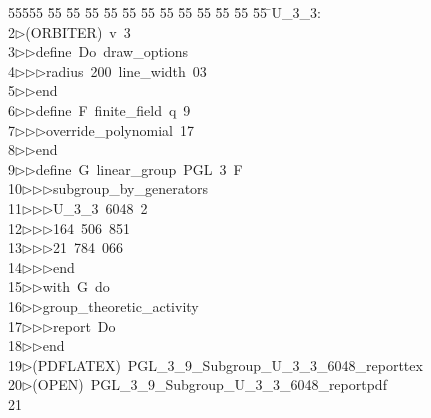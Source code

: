 %
%
\begin{tabbing}
55555 \= 55 \= 55 \= 55 \= 55 \= 55 \= 55 \= 55 \= 55 \= 55 \= 55 \= 55 \= 55 \= \>U\_3\_3:\\[0pt]
2\>$\triangleright$\>(ORBITER)\ v\ 3\ \\[0pt]
3\>$\triangleright$\>$\triangleright$\>define\ Do\ draw\_options\ \\[0pt]
4\>$\triangleright$\>$\triangleright$\>$\triangleright$\>radius\ 200\ line\_width\ 03\ \\[0pt]
5\>$\triangleright$\>$\triangleright$\>end\ \\[0pt]
6\>$\triangleright$\>$\triangleright$\>define\ F\ finite\_field\ q\ 9\ \\[0pt]
7\>$\triangleright$\>$\triangleright$\>$\triangleright$\>override\_polynomial\ 17\ \\[0pt]
8\>$\triangleright$\>$\triangleright$\>end\ \\[0pt]
9\>$\triangleright$\>$\triangleright$\>define\ G\ linear\_group\ PGL\ 3\ F\ \\[0pt]
10\>$\triangleright$\>$\triangleright$\>$\triangleright$\>subgroup\_by\_generators\ \\[0pt]
11\>$\triangleright$\>$\triangleright$\>$\triangleright$\>U\_3\_3\ 6048\ 2\ \\[0pt]
12\>$\triangleright$\>$\triangleright$\>$\triangleright$\>164\ 506\ 851\ \\[0pt]
13\>$\triangleright$\>$\triangleright$\>$\triangleright$21\ 784\ 066\ \\[0pt]
14\>$\triangleright$\>$\triangleright$\>$\triangleright$\>end\ \\[0pt]
15\>$\triangleright$\>$\triangleright$\>with\ G\ do\ \\[0pt]
16\>$\triangleright$\>$\triangleright$\>group\_theoretic\_activity\ \\[0pt]
17\>$\triangleright$\>$\triangleright$\>$\triangleright$\>report\ Do\ \\[0pt]
18\>$\triangleright$\>$\triangleright$\>end\\[0pt]
19\>$\triangleright$\>(PDFLATEX)\ PGL\_3\_9\_Subgroup\_U\_3\_3\_6048\_reporttex\\[0pt]
20\>$\triangleright$\>(OPEN)\ PGL\_3\_9\_Subgroup\_U\_3\_3\_6048\_reportpdf\\[0pt]
21\>\end{tabbing}
